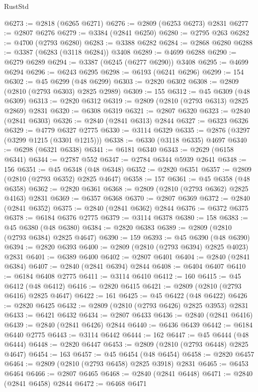 \begin{lexlean}{RustStd}
\begin{coremodule}
@6273 := @2818 (@6265 @6271)
@6276 := @2809 (@6253 @6273) @2831
@6277 := @2807 @6276
@6279 := @3384 (@2841 @6250)
@6280 := @2795 @263
@6282 := @4700 (@2793 @6280)
@6283 := @3388 @6282
@6284 := @2868 @6280
@6288 := @3387 (@6283 (@3118 @6284)) @3408
@6289 := @4699 @6288
@6290 := @6279 @6289
@6294 := @3387 (@6245 (@6277 @6290)) @3408
@6295 := @4699 @6294
@6296 := @6243 @6295
@6298 := @6193 (@6241 @6296)
@6299 := 154
@6302 := @45 @6299 (@48 @6299)
@6303 := @2820 @6302
@6308 := @2809 (@2810 (@2793 @6303) @2825 @2989)
@6309 := 155
@6312 := @45 @6309 (@48 @6309)
@6313 := @2820 @6312
@6319 := @2809 (@2810 (@2793 @6313) @2825 @2869) @2831
@6320 := @6308 @6319
@6321 := @2807 @6320
@6323 := @2840 (@2841 @6303)
@6326 := @2840 (@2841 @6313) @2844
@6327 := @6323 @6326
@6329 := @4779 @6327 @2775
@6330 := @3114 @6329
@6335 := @2876 (@3297 (@3299 @1215 (@3301 @1215)))
@6338 := @6330 (@3118 @6335) @4697
@6340 := @6298 (@6321 @6338)
@6341 := @6181 @6340
@6343 := @2629 (@6158 @6341)
@6344 := @2787 @552
@6347 := @2784 @6344 @5939 @2641
@6348 := 156
@6351 := @45 @6348 (@48 @6348)
@6352 := @2820 @6351
@6357 := @2809 (@2810 (@2793 @6352) @2825 @4647)
@6358 := 157
@6361 := @45 @6358 (@48 @6358)
@6362 := @2820 @6361
@6368 := @2809 (@2810 (@2793 @6362) @2825 @4163) @2831
@6369 := @6357 @6368
@6370 := @2807 @6369
@6372 := @2840 (@2841 @6352)
@6375 := @2840 (@2841 @6362) @2844
@6376 := @6372 @6375
@6378 := @6184 @6376 @2775
@6379 := @3114 @6378
@6380 := 158
@6383 := @45 @6380 (@48 @6380)
@6384 := @2820 @6383
@6389 := @2809 (@2810 (@2793 @6384) @2825 @4647)
@6390 := 159
@6393 := @45 @6390 (@48 @6390)
@6394 := @2820 @6393
@6400 := @2809 (@2810 (@2793 @6394) @2825 @4023) @2831
@6401 := @6389 @6400
@6402 := @2807 @6401
@6404 := @2840 (@2841 @6384)
@6407 := @2840 (@2841 @6394) @2844
@6408 := @6404 @6407
@6410 := @6184 @6408 @2775
@6411 := @3114 @6410
@6412 := 160
@6415 := @45 @6412 (@48 @6412)
@6416 := @2820 @6415
@6421 := @2809 (@2810 (@2793 @6416) @2825 @4647)
@6422 := 161
@6425 := @45 @6422 (@48 @6422)
@6426 := @2820 @6425
@6432 := @2809 (@2810 (@2793 @6426) @2825 @3953) @2831
@6433 := @6421 @6432
@6434 := @2807 @6433
@6436 := @2840 (@2841 @6416)
@6439 := @2840 (@2841 @6426) @2844
@6440 := @6436 @6439
@6442 := @6184 @6440 @2775
@6443 := @3114 @6442
@6444 := 162
@6447 := @45 @6444 (@48 @6444)
@6448 := @2820 @6447
@6453 := @2809 (@2810 (@2793 @6448) @2825 @4647)
@6454 := 163
@6457 := @45 @6454 (@48 @6454)
@6458 := @2820 @6457
@6464 := @2809 (@2810 (@2793 @6458) @2825 @3918) @2831
@6465 := @6453 @6464
@6466 := @2807 @6465
@6468 := @2840 (@2841 @6448)
@6471 := @2840 (@2841 @6458) @2844
@6472 := @6468 @6471

\end{coremodule}
\end{lexlean}
